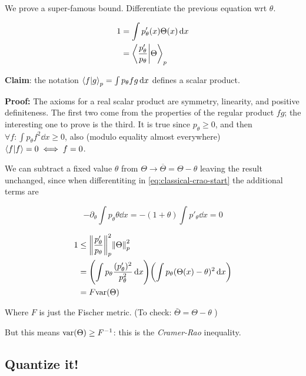 \documentclass[main_zanardi.tex]{subfiles}
\begin{document}
We prove a super-famous bound. Differentiate the previous equation wrt \( \theta \).

\begin{subequations}\label{eq:classical-crao-start}
\begin{align}
  1 &= \int  p' _\theta (x) \Theta (x) \dd{x}   \\
  &= \braket{\frac{p'_\theta}{p_\theta}}{\Theta}_p \label{eq:classical-crao-start-subeq}
\end{align}
\end{subequations}

\textbf{Claim}: the notation \( \braket{f}{g}_p = \int  p_\theta f g \dd{x}  \) defines a scalar product.

\begin{greenbox}
  \textbf{Proof: }
  The axioms for a real scalar product are symmetry, linearity, and positive definiteness. The first two come from the properties of the regular product \(fg\); the interesting one to prove is the third. It is true since \(p_ \theta \geq 0\), and then \(\forall f: \int  p_ \theta f^2  \dd{x} \geq 0 \), also (modulo equality almost everywhere) \(\braket{f}{f}=0 \iff f=0\).
\end{greenbox}

We can subtract a fixed value \( \theta \) from \(\Theta \rightarrow \overline{\Theta} = \Theta - \theta \) leaving the result unchanged, since when differentiting in  \eqref{eq:classical-crao-start} the additional terms are

\begin{equation}
  -\partial _ \theta \int  p_ \theta \theta \dd{x} = - (1 + \theta) \int  p' _ \theta \dd{x} = 0
\end{equation}

\begin{align}
  1 &\leq \norm{\frac{p_\theta '}{p_\theta}}^{2}_p \norm{\Theta}^2_p  \\
  &= \qty(\int  p_\theta \frac{(p_\theta ')^2}{p_\theta^2} \dd{x} )
  \qty(\int p_\theta (\Theta(x) - \theta)^2 \dd{x} )  \\
  &= F \text{var} \qty(\Theta)
\end{align}

Where \( F \) is just the Fischer metric. (To check: \( \bar{\Theta} = \Theta - \theta \) )

But this means \(\text{var} \qty(\Theta) \geq F ^{-1} \): this is the \emph{Cramer-Rao} inequality.

\subsection{Quantize it!}
\end{document}
